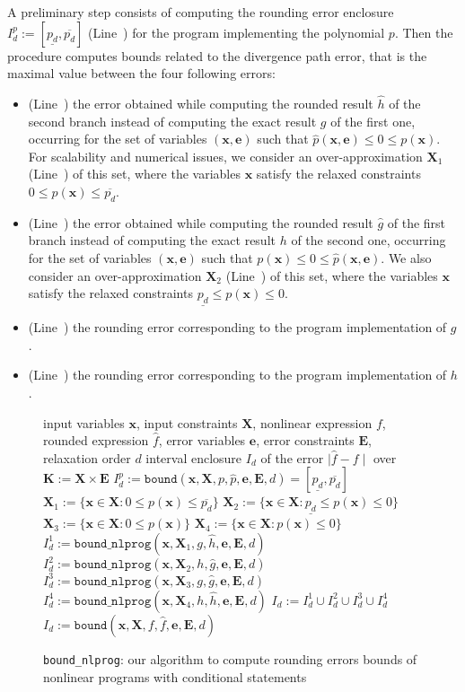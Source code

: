 \documentclass[preprint]{sigplanconf}
\newcommand{\code}[1]{\lstinline{#1}}
\newcommand{\x}{\mathbf{x}}
\newcommand{\e}{\mathbf{e}}
\def\E{\mathbf{E}}
\def\K{\mathbf{K}}
\def\X{\mathbf{X}}
\newcommand{\boundfun}[7]{\mathtt{bound}(#1, #2, #3, #4, #5, #6, #7)}
\newcommand{\boundnlprogfun}[7]{\mathtt{bound\_nlprog}(#1, #2, #3, #4, #5, #6, #7)}
\theoremstyle{plain}
\begin{document}
A preliminary step consists of computing the rounding error enclosure $I_d^p := [\underline{p_d}, \overline{p_d}]$ (Line~) for the program implementing the polynomial $p$. 
Then the procedure computes bounds related to the divergence path error, that is the maximal value between the four following errors: 
\begin{itemize}
\item (Line~) the error obtained while computing the rounded result $\hat{h}$ of the second branch instead of computing the exact result $g$ of the first one, occurring for the set of variables $(\x,\e)$ such that $\hat{p}(\x,\e) \leq 0 \leq p(\x)$. For scalability and numerical issues, we consider an over-approximation $\X_1$ (Line~) of this set, where the variables $\x$ satisfy the relaxed constraints $0 \leq p(\x) \leq \overline{p_d}$.
\item (Line~) the error obtained while computing the rounded result $\hat{g}$ of the first branch instead of computing the exact result $h$ of the second one, occurring for the set of variables $(\x,\e)$ such that $p(\x) \leq 0 \leq \hat{p}(\x,\e)$. We also consider an over-approximation $\X_2$ (Line~) of this set, where the variables $\x$ satisfy the relaxed constraints $\underline{p_d} \leq p(\x) \leq 0$.
\item (Line~) the rounding error corresponding to the program implementation of $g$.
\item(Line~) the rounding error corresponding to the program implementation of $h$.
\end{itemize}
%
\begin{figure}[!ht]
\begin{algorithmic}[1]
\Require input variables $\x$, input constraints $\X$, nonlinear expression $f$, rounded expression $\hat{f}$, error variables $\e$, error constraints $\E$, relaxation order $d$
\Ensure interval enclosure $I_d$ of the error $\mid \hat{f} - f  \mid$ over $\K := \X \times \E$
%
 \label{line:cnd}
\State $I_d^p := \boundfun{\x}{\X}{p}{\hat{p}}{\e}{\E}{d} = [\underline{p_d}, \overline{p_d}]$ \label{line:polcnd}
\State $\X_1 := \{ \x \in \X : 0 \leq p(\x) \leq \overline{p_d} \}$ \label{line:X1}
\State $\X_2 := \{ \x \in \X : \underline{p_d} \leq p(\x) \leq 0 \}$\label{line:X2}
\State $\X_3 := \{ \x \in \X : 0 \leq p(\x) \}$\label{line:X3}
\State $\X_4 := \{ \x \in \X : p(\x) \leq 0 \}$\label{line:X4}
\State $I_d^1 := \boundnlprogfun{\x}{\X_1}{g}{\hat{h}}{\e}{\E}{d}$\label{line:I1}
\State $I_d^2 := \boundnlprogfun{\x}{\X_2}{h}{\hat{g}}{\e}{\E}{d}$\label{line:I2}
\State $I_d^3 := \boundnlprogfun{\x}{\X_3}{g}{\hat{g}}{\e}{\E}{d}$\label{line:I3}
\State $I_d^4 := \boundnlprogfun{\x}{\X_4}{h}{\hat{h}}{\e}{\E}{d}$\label{line:I4}
\State \Return $I_d := I_d^1 \cup I_d^2 \cup I_d^3 \cup I_d^4$ \label{line:endcnd}
\Else \State \Return $I_d := \boundfun{\x}{\X}{f}{\hat{f}}{\e}{\E}{d}$ \label{line:noncnd}
\EndIf
%
\end{algorithmic}
\caption{\code{bound_nlprog}: our algorithm to compute rounding errors bounds of nonlinear programs with conditional statements}
\label{alg:bound_nlprog}
\end{figure}
%
\end{document}
